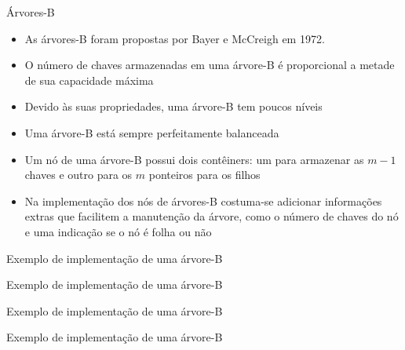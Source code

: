 \begin{frame}[fragile]{Árvores-B}

	\begin{itemize}
		\item As árvores-B foram propostas por Bayer e McCreigh em 1972.

		\item O número de chaves armazenadas em uma árvore-B é proporcional a metade de 
            sua capacidade máxima

		\item Devido às suas propriedades, uma árvore-B tem poucos níveis

		\item Uma árvore-B está sempre perfeitamente balanceada

		\item Um nó de uma árvore-B possui dois contêiners: um para armazenar as $m-1$ chaves e 
            outro para os  $m$ ponteiros para os filhos

		\item Na implementação dos nós de árvores-B costuma-se adicionar informações extras que 
            facilitem a manutenção da árvore, como o número de chaves do nó e uma indicação se o 
            nó é folha ou não
	\end{itemize}

\end{frame}

\begin{frame}[fragile]{Exemplo de implementação de uma árvore-B}
\end{frame}

\begin{frame}[fragile]{Exemplo de implementação de uma árvore-B}
\end{frame}

\begin{frame}[fragile]{Exemplo de implementação de uma árvore-B}
\end{frame}

\begin{frame}[fragile]{Exemplo de implementação de uma árvore-B}
\end{frame}

